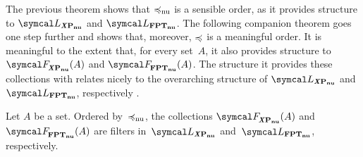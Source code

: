 The previous theorem shows that $\preccurlyeq_\mathrm{nu}$ is a sensible order, as it provides structure to $\calL_\clXnu{P}$ and $\calL_\clnu{FPT}$.
The following companion theorem goes one step further and shows that, moreover, $\preccurlyeq$ is a meaningful order.
It is meaningful to the extent that, for every set~$A$, it also provides structure to $\calF_\clXnu{P}(A)$ and $\calF_\clnu{FPT}(A)$.
The structure it provides these collections with relates nicely to the overarching structure of $\calL_\clXnu{P}$ and $\calL_\clnu{FPT}$, respectively \parencite[see also][]{davey2002introduction,abramsky1994domain}.
\begin{theorem}
\label{thm:nufilter}%
  Let $A$ be a set.
  Ordered by~$\preccurlyeq_\mathrm{nu}$, the collections $\calF_\clXnu{P}(A)$ and $\calF_\clnu{FPT}(A)$ are filters in~$\calL_\clXnu{P}$ and~$\calL_\clnu{FPT}$, respectively.
\end{theorem}
